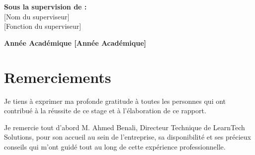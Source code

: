 \documentclass[12pt, a4paper]{report}
\begin{document}
\begin{titlepage}
\begin{center}
    
    \vspace{2cm}
    
    {\large\textbf{Sous la supervision de :}}\\\vspace{0.3cm}
    {\large [Nom du superviseur]}\\\vspace{0.2cm}
    {\large [Fonction du superviseur]}
    
    \vfill
    
    {\large\textbf{Année Académique [Année Académique]}}\par
  \end{center}
  
  \begin{center}
    \vspace{1cm}
    \noindent\makebox[\linewidth]{\color{primary}\rule{\paperwidth}{0.4cm}}
  \end{center}
\end{titlepage}

\chapter*{Remerciements}
\thispagestyle{fancy}

Je tiens à exprimer ma profonde gratitude à toutes les personnes qui ont contribué à la réussite de ce stage et à l'élaboration de ce rapport.

Je remercie tout d'abord M. Ahmed Benali, Directeur Technique de LearnTech Solutions, pour son accueil au sein de l'entreprise, sa disponibilité et ses précieux conseils qui m'ont guidé tout au long de cette expérience professionnelle.
\end{document}
